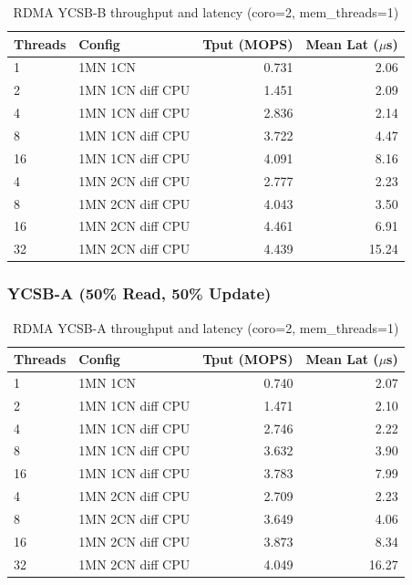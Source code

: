 \documentclass[11pt,a4paper]{article}
\begin{document}
\begin{table}[H]
\centering
\caption{RDMA YCSB-B throughput and latency (coro=2, mem\_threads=1)}
\label{tab:rdma-ycsbb}
\small
\begin{tabular}{@{}llrr@{}}
\toprule
\textbf{Threads} & \textbf{Config} & \textbf{Tput (MOPS)} & \textbf{Mean Lat ($\mu$s)} \\
\midrule
1  & 1MN 1CN             & 0.731 & 2.06 \\
2  & 1MN 1CN diff CPU    & 1.451 & 2.09 \\
4  & 1MN 1CN diff CPU    & 2.836 & 2.14 \\
8  & 1MN 1CN diff CPU    & 3.722 & 4.47 \\
16 & 1MN 1CN diff CPU    & 4.091 & 8.16 \\
\midrule
4  & 1MN 2CN diff CPU    & 2.777 & 2.23 \\
8  & 1MN 2CN diff CPU    & 4.043 & 3.50 \\
16 & 1MN 2CN diff CPU    & 4.461 & 6.91 \\
32 & 1MN 2CN diff CPU    & 4.439 & 15.24 \\
\bottomrule
\end{tabular}
\end{table}

\subsubsection{YCSB-A (50\% Read, 50\% Update)}

\begin{table}[H]
\centering
\caption{RDMA YCSB-A throughput and latency (coro=2, mem\_threads=1)}
\label{tab:rdma-ycsba}
\small
\begin{tabular}{@{}llrr@{}}
\toprule
\textbf{Threads} & \textbf{Config} & \textbf{Tput (MOPS)} & \textbf{Mean Lat ($\mu$s)} \\
\midrule
1  & 1MN 1CN             & 0.740 & 2.07 \\
2  & 1MN 1CN diff CPU    & 1.471 & 2.10 \\
4  & 1MN 1CN diff CPU    & 2.746 & 2.22 \\
8  & 1MN 1CN diff CPU    & 3.632 & 3.90 \\
16 & 1MN 1CN diff CPU    & 3.783 & 7.99 \\
\midrule
4  & 1MN 2CN diff CPU    & 2.709 & 2.23 \\
8  & 1MN 2CN diff CPU    & 3.649 & 4.06 \\
16 & 1MN 2CN diff CPU    & 3.873 & 8.34 \\
32 & 1MN 2CN diff CPU    & 4.049 & 16.27 \\
\bottomrule
\end{tabular}
\end{table}
\end{document}
